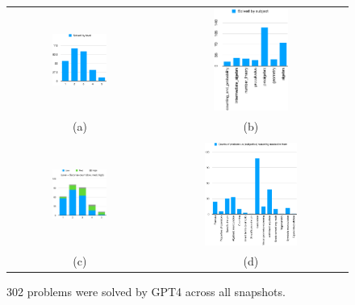 \documentclass[11pt,a4paper]{article}
\begin{document}
\begin{figure}
  \begin{tabular}{cc}

    \includegraphics[width=0.4\textwidth]{gpt4-by-level} &
    \includegraphics[width=0.4\textwidth]{gpt4-by-subject} \\
    (a) & (b) \\\\

    \includegraphics[width=0.4\textwidth]{gpt4-surprise} &
    \includegraphics[width=0.5\textwidth]{gpt4-reasoning-needed} \\
    (c) & (d)

  \end{tabular}
  \caption{\label{fig:gpt4-fn-solved} 302 problems were solved by GPT4 across all snapshots.}
\end{figure}
\end{document}

